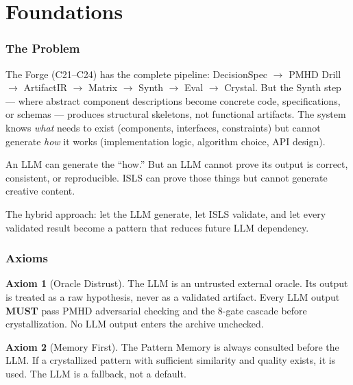 \documentclass[11pt,a4paper,twoside]{article}
\theoremstyle{definition}
\newtheorem{axiom}{Axiom}[section]
\theoremstyle{plain}
\theoremstyle{remark}
\newcommand{\ISLS}{\textsf{ISLS}}
\begin{document}
\tableofcontents
\newpage


\part{Foundations}\label{part:foundations}

\section{The Problem}\label{sec:problem}

The Forge (C21--C24) has the complete pipeline: DecisionSpec $\to$
PMHD Drill $\to$ ArtifactIR $\to$ Matrix $\to$ Synth $\to$ Eval $\to$
Crystal. But the Synth step --- where abstract component descriptions
become concrete code, specifications, or schemas --- produces
structural skeletons, not functional artifacts. The system knows
\emph{what} needs to exist (components, interfaces, constraints) but
cannot generate \emph{how} it works (implementation logic, algorithm
choice, API design).

An LLM can generate the ``how.'' But an LLM cannot prove its output
is correct, consistent, or reproducible. \ISLS{} can prove those
things but cannot generate creative content.

The hybrid approach: let the LLM generate, let \ISLS{} validate, and
let every validated result become a pattern that reduces future LLM
dependency.

\section{Axioms}\label{sec:axioms}

\begin{axiom}[Oracle Distrust]\label{ax:distrust}
The LLM is an untrusted external oracle. Its output is treated as a
raw hypothesis, never as a validated artifact. Every LLM output
\textbf{MUST} pass PMHD adversarial checking and the 8-gate cascade
before crystallization. No LLM output enters the archive unchecked.
\end{axiom}

\begin{axiom}[Memory First]\label{ax:memoryfirst}
The Pattern Memory is always consulted before the LLM. If a
crystallized pattern with sufficient similarity and quality exists,
it is used. The LLM is a fallback, not a default.
\end{axiom}
\end{document}
